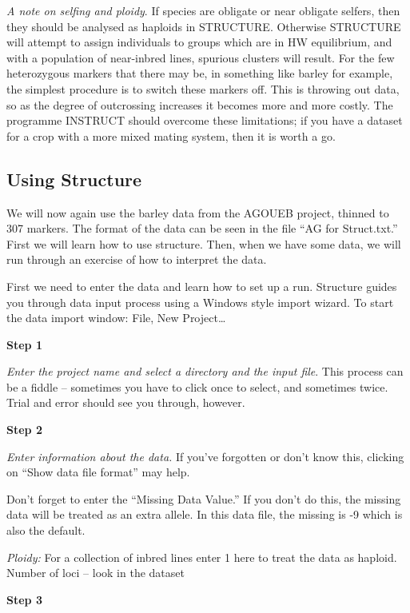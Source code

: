 \documentclass[
]{book}
\begin{document}
\emph{A note on selfing and ploidy}. If species are obligate or near obligate selfers, then they should be analysed as haploids in STRUCTURE. Otherwise STRUCTURE will attempt to assign individuals to groups which are in HW equilibrium, and with a population of near-inbred lines, spurious clusters will result. For the few heterozygous markers that there may be, in something like barley for example, the simplest procedure is to switch these markers off. This is throwing out data, so as the degree of outcrossing increases it becomes more and more costly. The programme INSTRUCT should overcome these limitations; if you have a dataset for a crop with a more mixed mating system, then it is worth a go.

\hypertarget{using-structure}{%
\subsection{Using Structure}\label{using-structure}}

We will now again use the barley data from the AGOUEB project, thinned to 307 markers. The format of the data can be seen in the file ``AG for Struct.txt.'' First we will learn how to use structure. Then, when we have some data, we will run through an exercise of how to interpret the data.

First we need to enter the data and learn how to set up a run. Structure guides you through data input process using a Windows style import wizard. To start the data import window: File, New Project\ldots{}

\textbf{Step 1}

\emph{Enter the project name and select a directory and the input file}. This process can be a fiddle -- sometimes you have to click once to select, and sometimes twice. Trial and error should see you through, however.

\textbf{Step 2}

\emph{Enter information about the data.} If you've forgotten or don't know this, clicking on ``Show data file format'' may help.

Don't forget to enter the ``Missing Data Value.'' If you don't do this, the missing data will be treated as an extra allele. In this data file, the missing is -9 which is also the default.

\emph{Ploidy:} For a collection of inbred lines enter 1 here to treat the data as haploid. Number of loci -- look in the dataset

\textbf{Step 3}
\end{document}
